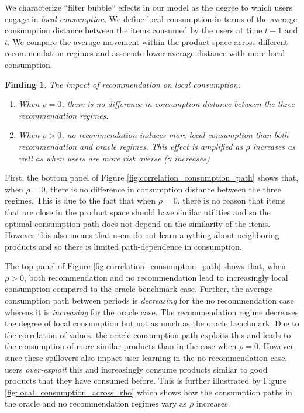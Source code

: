 \documentclass[sigconf]{acmart}
\newtheorem{finding}{Finding}
\begin{document}
We characterize ``filter bubble'' effects in our model as the degree to which users engage in \textit{local consumption}. We define local consumption in terms of the average consumption distance between the items consumed by the users at time $t-1$ and $t$. We compare the average movement within the product space across different recommendation regimes and associate lower average distance with more local consumption.

\begin{finding}\label{finding_local_consumption}
The impact of recommendation on local consumption:
\begin{enumerate}
\item When $\rho = 0$, there is no difference in consumption distance between the three recommendation regimes.
\item When $\rho > 0$, no recommendation induces more local consumption than both recommendation and oracle regimes. This effect is amplified as $\rho$ increases as well as when users are more risk averse ($\gamma$ increases)
\end{enumerate}
\end{finding}

First, the bottom panel of Figure \ref{fig:correlation_consumption_path} shows that, when $\rho = 0$, there is no difference in consumption distance between the three regimes. This is due to the fact that when $\rho = 0$, there is no reason that items that are close in the product space should have similar utilities and so the optimal consumption path does not depend on the similarity of the items. However this also means that users do not learn anything about neighboring products and so there is limited path-dependence in consumption.
\par

The top panel of Figure \ref{fig:correlation_consumption_path} shows that, when $\rho > 0$, both recommendation and no recommendation lead to increasingly local consumption compared to the oracle benchmark case. Further, the average consumption path between periods is \textit{decreasing} for the no recommendation case whereas it is \textit{increasing} for the oracle case. The recommendation regime decreases the degree of local consumption but not as much as the oracle benchmark. Due to the correlation of values, the oracle consumption path exploits this and leads to the consumption of more similar products than in the case when $\rho = 0$. However, since these spillovers also impact user learning in the no recommendation case, users \textit{over-exploit} this and increasingly consume products similar to good products that they have consumed before. This is further illustrated by Figure \ref{fig:local_consumption_across_rho} which shows how the consumption paths in the oracle and no recommendation regimes vary as $\rho$ increases.
\par
\end{document}
